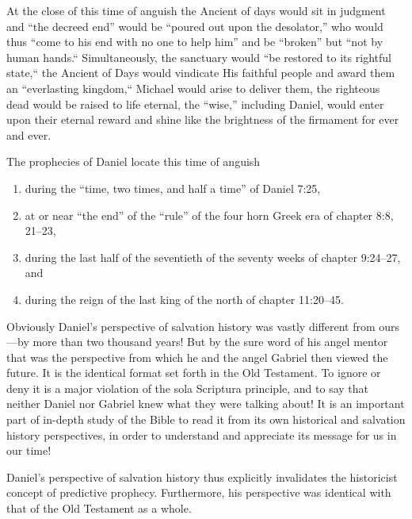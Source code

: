 At the close of this time of anguish the Ancient of days would sit in
judgment and ``the decreed end'' would be ``poured out upon the desolator,'' who
would thus ``come to his end with no one to help him'' and be ``broken'' but
``not by human hands.``
Simultaneously, the sanctuary would ``be restored to
its rightful state,`` the Ancient of Days would vindicate His faithful people
and award them an ``everlasting kingdom,`` Michael would arise to deliver
them, the righteous dead would be raised to life eternal, the ``wise,''
including Daniel, would enter upon their eternal reward and shine like the
brightness of the firmament for ever and ever.

The prophecies of Daniel locate this time of anguish 
\begin{enumerate}
    \item during the ``time,
two times, and half a time'' of Daniel 7:25, 
    \item at or near ``the end'' of the
``rule'' of the four horn Greek era of chapter 8:8, 21--23, 
    \item during the last
half of the seventieth of the seventy weeks of chapter 9:24--27, and 
    \item during the reign of the last king of the north of chapter 11:20--45. 
\end{enumerate}

Obviously Daniel's perspective of salvation history was vastly different
from ours---by more than two thousand years! But by the sure word of his
angel mentor that was the perspective from which he and the angel Gabriel
then viewed the future. It is the identical format set forth in the Old
Testament.\noteXXXV{}
To ignore or deny it is a major violation of the sola Scriptura
principle, and to say that neither Daniel nor Gabriel knew what they were
talking about! It is an important part of in-depth study of the Bible to 
read it from its own historical and salvation history perspectives, in order
to understand and appreciate its message for us in our time!

Daniel's perspective of salvation history thus explicitly invalidates the
historicist concept of predictive prophecy. Furthermore, his perspective was
identical with that of the Old Testament as a whole.

